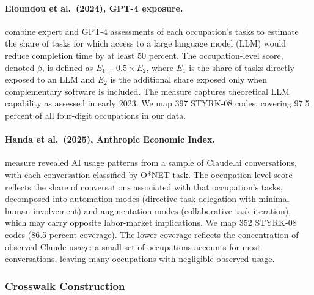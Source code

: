 \documentclass[12pt]{article}
\begin{document}
\paragraph{Eloundou et al.\ (2024), GPT-4 exposure.} \citet{eloundou2024} combine expert and GPT-4 assessments of each occupation's tasks to estimate the share of tasks for which access to a large language model (LLM) would reduce completion time by at least 50 percent. The occupation-level score, denoted $\beta$, is defined as $E_1 + 0.5 \times E_2$, where $E_1$ is the share of tasks directly exposed to an LLM and $E_2$ is the additional share exposed only when complementary software is included. The measure captures theoretical LLM capability as assessed in early 2023. We map 397 STYRK-08 codes, covering 97.5 percent of all four-digit occupations in our data.

\paragraph{Handa et al.\ (2025), Anthropic Economic Index.} \citet{handa2025} measure revealed AI usage patterns from a sample of Claude.ai conversations, with each conversation classified by O*NET task. The occupation-level score reflects the share of conversations associated with that occupation's tasks, decomposed into automation modes (directive task delegation with minimal human involvement) and augmentation modes (collaborative task iteration), which may carry opposite labor-market implications. We map 352 STYRK-08 codes (86.5 percent coverage). The lower coverage reflects the concentration of observed Claude usage: a small set of occupations accounts for most conversations, leaving many occupations with negligible observed usage.

\subsubsection*{Crosswalk Construction}
\end{document}
